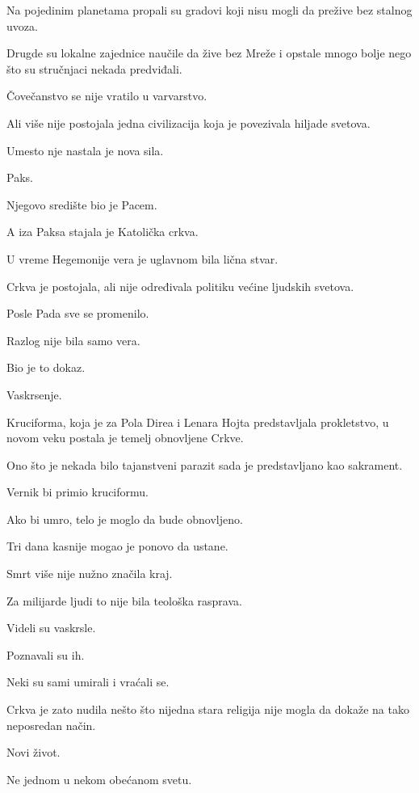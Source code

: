 Na pojedinim planetama propali su gradovi koji nisu mogli da prežive bez stalnog uvoza.

Drugde su lokalne zajednice naučile da žive bez Mreže i opstale mnogo bolje nego što su stručnjaci nekada predviđali.

\bigskip

Čovečanstvo se nije vratilo u varvarstvo.

Ali više nije postojala jedna civilizacija koja je povezivala hiljade svetova.

Umesto nje nastala je nova sila.

Paks.

\bigskip

Njegovo središte bio je Pacem.

A iza Paksa stajala je Katolička crkva.

\bigskip

U vreme Hegemonije vera je uglavnom bila lična stvar.

Crkva je postojala, ali nije određivala politiku većine ljudskih svetova.

Posle Pada sve se promenilo.

Razlog nije bila samo vera.

Bio je to dokaz.

Vaskrsenje.

\bigskip

Kruciforma, koja je za Pola Direa i Lenara Hojta predstavljala prokletstvo, u novom veku postala je temelj obnovljene Crkve.

Ono što je nekada bilo tajanstveni parazit sada je predstavljano kao sakrament.

Vernik bi primio kruciformu.

Ako bi umro, telo je moglo da bude obnovljeno.

Tri dana kasnije mogao je ponovo da ustane.

Smrt više nije nužno značila kraj.

\bigskip

Za milijarde ljudi to nije bila teološka rasprava.

Videli su vaskrsle.

Poznavali su ih.

Neki su sami umirali i vraćali se.

Crkva je zato nudila nešto što nijedna stara religija nije mogla da dokaže na tako neposredan način.

Novi život.

Ne jednom u nekom obećanom svetu.

